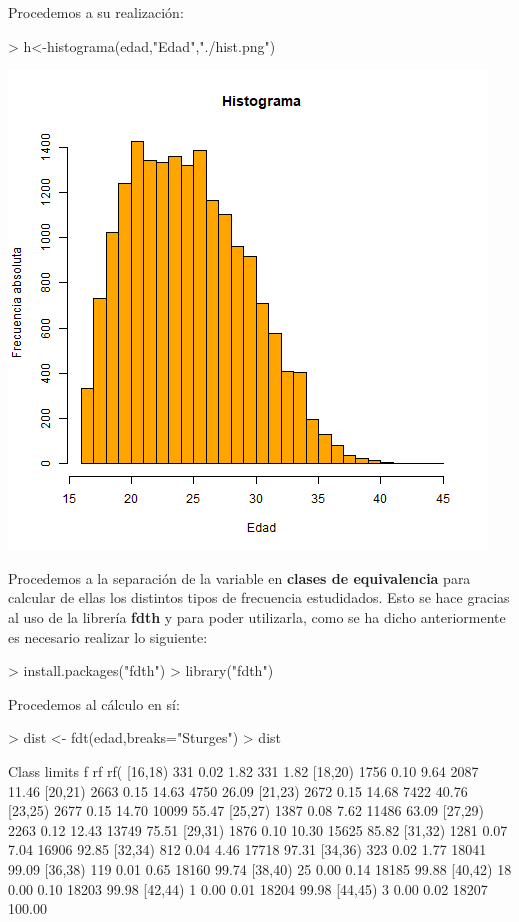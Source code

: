 \documentclass [a4paper] {article}
\begin{document}
Procedemos a su realizaci\'on:
\begin{Schunk}
\begin{Sinput}
> h<-histograma(edad,"Edad","./hist.png")
\end{Sinput}
\end{Schunk}
\includegraphics[width=\textwidth]{hist}


\bigskip
Procedemos a la separaci\'on de la variable en \textbf{clases de equivalencia} para calcular de ellas los distintos tipos de
frecuencia estudidados. Esto se hace gracias al uso de la librer\'ia \textbf{fdth} y para poder utilizarla, como se ha dicho 
anteriormente es necesario realizar lo siguiente:
\begin{Schunk}
\begin{Sinput}
> install.packages("fdth")
> library("fdth")
\end{Sinput}
\end{Schunk}

Procedemos al c\'alculo en s\'i:
\begin{Schunk}
\begin{Sinput}
> dist <- fdt(edad,breaks="Sturges")
> dist
\end{Sinput}
\begin{Soutput}
 Class limits    f   rf rf(%
      [16,18)  331 0.02  1.82   331   1.82
      [18,20) 1756 0.10  9.64  2087  11.46
      [20,21) 2663 0.15 14.63  4750  26.09
      [21,23) 2672 0.15 14.68  7422  40.76
      [23,25) 2677 0.15 14.70 10099  55.47
      [25,27) 1387 0.08  7.62 11486  63.09
      [27,29) 2263 0.12 12.43 13749  75.51
      [29,31) 1876 0.10 10.30 15625  85.82
      [31,32) 1281 0.07  7.04 16906  92.85
      [32,34)  812 0.04  4.46 17718  97.31
      [34,36)  323 0.02  1.77 18041  99.09
      [36,38)  119 0.01  0.65 18160  99.74
      [38,40)   25 0.00  0.14 18185  99.88
      [40,42)   18 0.00  0.10 18203  99.98
      [42,44)    1 0.00  0.01 18204  99.98
      [44,45)    3 0.00  0.02 18207 100.00
\end{Soutput}
\end{Schunk}
\end{document}

